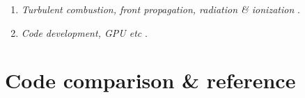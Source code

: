 \documentclass[12pt]{article}
\begin{document}
\begin{enumerate}
\begin{enumerate}
\item
{\em Turbulent combustion, front propagation, radiation \& ionization} \citep{
Zhang_etal_2020comb,%
2020GApFD.114...35A,%
2020arXiv201007046B,%
2020GApFD.114..162B,%
2020GApFD.114...58Q,%
2020arXiv200203638B,%
2019OLEB...49...49B,%
2019PhFl...31e6102M,%
2016A&A...587A..90B,%
2015AtmRe.153...49B,%
2015PhRvE..91b1001C,%
2014A&A...571A..68B,%
2011arXiv1110.1163T,%
2011PhRvE..83a6304B,%
2011JCoPh.230....1B,%
2004IJAsB...3..209B%
}.

\item
{\em Code development, GPU etc} \citep{
2017CoPhC.217...11P%
}.

\end{enumerate}
\end{enumerate}

\section{Code comparison \& reference}
\end{document}
